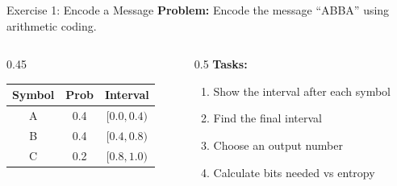\documentclass[aspectratio=169,12pt]{beamer}
\begin{document}
\begin{frame}{Exercise 1: Encode a Message}
    \textbf{Problem:} Encode the message ``ABBA'' using arithmetic coding.
    
    \begin{columns}
        \begin{column}{0.45\textwidth}
            \begin{center}
                \begin{tabular}{c|c|c}
                    \toprule
                    Symbol & Prob & Interval \\
                    \midrule
                    A & 0.4 & $[0.0, 0.4)$ \\
                    B & 0.4 & $[0.4, 0.8)$ \\
                    C & 0.2 & $[0.8, 1.0)$ \\
                    \bottomrule
                \end{tabular}
            \end{center}
        \end{column}
        \begin{column}{0.5\textwidth}
            \textbf{Tasks:}
            \begin{enumerate}
                \item Show the interval after each symbol
                \item Find the final interval
                \item Choose an output number
                \item Calculate bits needed vs entropy
            \end{enumerate}
        \end{column}
    \end{columns}
\end{frame}
\end{document}
